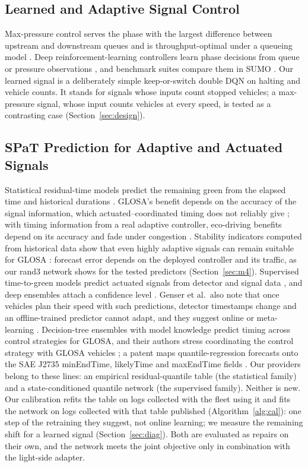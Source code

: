 \subsection{Learned and Adaptive Signal Control}
Max-pressure control serves the phase with the largest difference between upstream and downstream queues and is throughput-optimal under a
queueing model \cite{varaiya2013}. Deep reinforcement-learning controllers learn phase decisions from queue or pressure observations
\cite{wei2018,wei2019}, and benchmark suites compare them in SUMO \cite{ault2021}. Our learned signal is a deliberately simple
keep-or-switch double DQN \cite{vanhasselt2016} on halting and vehicle counts. It stands for signals whose inputs count stopped vehicles; a
max-pressure signal, whose input counts vehicles at every speed, is tested as a contrasting case (Section~\ref{sec:design}).

\subsection{SPaT Prediction for Adaptive and Actuated Signals}
Statistical residual-time models predict the remaining green from the elapsed time and historical durations
\cite{bodenheimer2014,mahler2014}. GLOSA's benefit depends on the accuracy of the signal information, which actuated--coordinated
timing does not reliably give \cite{stevanovic2013}; with timing information from a real adaptive controller, eco-driving benefits depend
on its accuracy and fade under congestion \cite{nyserda2019}. Stability indicators computed from historical data show that even highly adaptive signals can remain
suitable for GLOSA \cite{otto2025}: forecast error depends on the deployed controller and its traffic, as our rand3 network
shows for the tested predictors (Section~\ref{sec:m4}). Supervised time-to-green models predict actuated signals from detector and signal data
\cite{genser2024}, and deep ensembles attach a confidence level \cite{eteifa2025}. Genser et al.\ also note that once vehicles plan their
speed with such predictions, detector timestamps change and an offline-trained predictor cannot adapt, and they suggest online or
meta-learning \cite{genser2024}. Decision-tree ensembles with model knowledge predict timing across control strategies for GLOSA,
and their authors stress coordinating the control strategy with GLOSA vehicles \cite{malena2025}; a patent maps quantile-regression
forecasts onto the SAE J2735 minEndTime, likelyTime and maxEndTime fields \cite{ep3985636}. Our providers belong to these lines: an empirical
residual-quantile table (the statistical family) and a state-conditioned quantile network (the supervised family). Neither is new. Our
calibration refits the table on logs collected with the fleet using it and fits the network on logs collected with that table published
(Algorithm~\ref{alg:cal}): one step of the retraining they suggest, not online learning; we measure the remaining shift for a learned
signal (Section~\ref{sec:diag}). Both are
evaluated as repairs on their own, and the network meets the joint objective only in combination with the light-side adapter.

